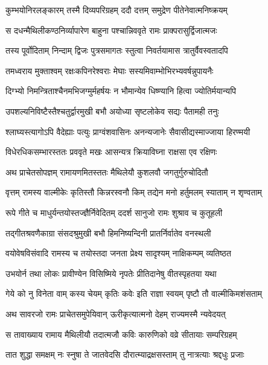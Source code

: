 \twolineshloka
{कुम्भयोनिरलङ्कारम् तस्मै दिव्यपरिग्रहम्}
{ददौ दत्तम् समुद्रेण पीतेनेवात्मनिष्क्रयम्} %

\twolineshloka
{स दधन्मैथिलीकण्ठनिर्व्यापारेण बाहुना}
{पश्चान्निववृते रामः प्राक्परासुर्द्विजात्मजः} %

\twolineshloka
{तस्य पूर्वोदिताम् निन्दाम् द्विजः पुत्रसमागतः}
{स्तुत्वा निवर्तयामास त्रातुर्वैवस्वतादपि} %

\twolineshloka
{तमध्वराय मुक्ताश्वम् रक्षःकपिनरेश्वराः}
{मेघाः सस्यमिवाम्भोभिरभ्यवर्षन्नुपायनैः} %

\twolineshloka
{दिग्भ्यो निमन्त्रिताश्चैनमभिजग्मुर्महर्षयः}
{न भौमान्येव धिष्ण्यानि हित्वा ज्योतिर्मयान्यपि} %

\twolineshloka
{उपशल्यनिविष्टैस्तैश्चतुर्द्वारमुखी बभौ}
{अयोध्या सृष्टलोकेव सद्यः पैतामही तनुः} %

\twolineshloka
{श्लाघ्यस्त्यागोऽपि वैदेह्याः पत्युः प्राग्वंशवासिनः}
{अनन्यजानेः सैवासीद्यस्माज्जाया हिरण्मयी} %

\twolineshloka
{विधेरधिकसम्भारस्ततः प्रववृते मखः}
{आसन्यत्र क्रियाविघ्ना राक्षसा एव रक्षिणः} %

\twolineshloka
{अथ प्राचेतसोपज्ञम् रामायणमितस्ततः}
{मैथिलेयौ कुशलवौ जगतुर्गुरुचोदितौ} %

\twolineshloka
{वृत्तम् रामस्य वाल्मीकेः कृतिस्तौ किन्नरस्वनौ}
{किम् तद्येन मनो हर्तुमलम् स्याताम् न शृण्वताम्} %

\twolineshloka
{रूपे गीते च माधुर्यन्तयोस्तज्ज्ञैर्निवेदितम्}
{ददर्श सानुजो रामः शुश्राव च कुतूहली} %

\twolineshloka
{तद्गीतश्रवणैकाग्रा संसदश्रुमुखी बभौ}
{हिमनिष्यन्दिनी प्रातर्निर्वातेव वनस्थली} %

\twolineshloka
{वयोवेषविसंवादि रामस्य च तयोस्तदा}
{जनता प्रेक्ष्य सादृश्यम् नाक्षिकम्पम् व्यतिष्ठत} %

\twolineshloka
{उभयोर्न तथा लोकः प्रावीण्येन विसिष्मिये}
{नृपतेः प्रीतिदानेषु वीतस्पृहतया यथा} %

\twolineshloka
{गेये को नु विनेता वाम् कस्य चेयम् कृतिः कवेः}
{इति राज्ञा स्वयम् पृष्टौ तौ वाल्मीकिमशंसताम्} %

\twolineshloka
{अथ सावरजो रामः प्राचेतसमुपेयिवान्}
{ऊरीकृत्यात्मनो देहम् राज्यमस्मै न्यवेदयत्} %

\twolineshloka
{स तावाख्याय रामाय मैथिलीयौ तदात्मजौ}
{कविः कारुणिको वव्रे सीतायाः सम्परिग्रहम्} %

\twolineshloka
{तात शुद्धा समक्षम् नः स्नुषा ते जातवेदसि}
{दौरात्म्याद्रक्षसस्ताम् तु नात्रत्याः श्रद्दधुः प्रजाः} %

